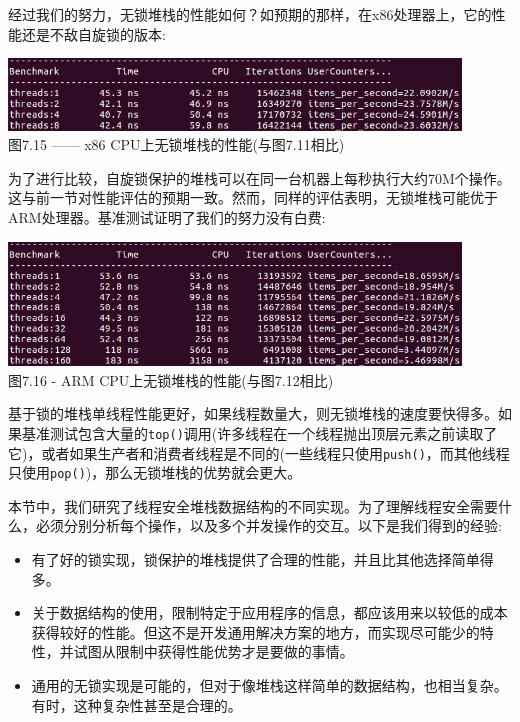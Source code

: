 经过我们的努力，无锁堆栈的性能如何？如预期的那样，在x86处理器上，它的性能还是不敌自旋锁的版本:

\begin{center}
\includegraphics[width=0.9\textwidth]{content/2/chapter7/images/15.jpg}\\ 
图7.15 —— x86 CPU上无锁堆栈的性能(与图7.11相比)
\end{center}

为了进行比较，自旋锁保护的堆栈可以在同一台机器上每秒执行大约70M个操作。这与前一节对性能评估的预期一致。然而，同样的评估表明，无锁堆栈可能优于ARM处理器。基准测试证明了我们的努力没有白费:

\begin{center}
\includegraphics[width=0.9\textwidth]{content/2/chapter7/images/16.jpg}\\ 
图7.16 - ARM CPU上无锁堆栈的性能(与图7.12相比)
\end{center}

基于锁的堆栈单线程性能更好，如果线程数量大，则无锁堆栈的速度要快得多。如果基准测试包含大量的\texttt{top()}调用(许多线程在一个线程抛出顶层元素之前读取了它)，或者如果生产者和消费者线程是不同的(一些线程只使用\texttt{push()}，而其他线程只使用\texttt{pop()})，那么无锁堆栈的优势就会更大。

本节中，我们研究了线程安全堆栈数据结构的不同实现。为了理解线程安全需要什么，必须分别分析每个操作，以及多个并发操作的交互。以下是我们得到的经验:

\begin{itemize}
\item 
有了好的锁实现，锁保护的堆栈提供了合理的性能，并且比其他选择简单得多。

\item 
关于数据结构的使用，限制特定于应用程序的信息，都应该用来以较低的成本获得较好的性能。但这不是开发通用解决方案的地方，而实现尽可能少的特性，并试图从限制中获得性能优势才是要做的事情。

\item 
通用的无锁实现是可能的，但对于像堆栈这样简单的数据结构，也相当复杂。有时，这种复杂性甚至是合理的。

\end{itemize}

